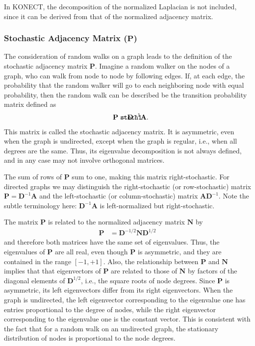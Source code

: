 \documentclass{article}
\def\mathnote#1{%
  \tag*{\rlap{\hspace\marginparsep\smash{\parbox[t]{\marginparwidth}{#1}}}}
}
\begin{document}
In KONECT, the decomposition of the normalized Laplacian is not
included, since it can be derived from that of the normalized adjacency
matrix. 

\subsubsection{Stochastic Adjacency Matrix ($\mathbf P$)}
The consideration of random walks on a graph leads to the definition of
the stochastic adjacency matrix $\mathbf P$.  Imagine a random walker on
the nodes of a graph, who can walk from node to node by following
edges.  If, at each edge, the probability that the random walker will go
to each neighboring node with equal probability, then the random walk
can be described be the transition probability matrix defined as
\begin{align}
  \mathnote{\texttt{stoch1}}
  \mathbf P &= \mathbf D^{-1} \mathbf A.
\end{align}
This matrix is called the stochastic adjacency matrix.  It is asymmetric,
even when the graph is undirected, except when the graph is regular,
i.e., when all degrees are the same.  
Thus, its eigenvalue decomposition
is not always defined, and in any case may not involve orthogonal
matrices. 

The sum of rows of $\mathbf P$ sum to one, making this matrix
right-stochastic. 
For directed graphs we may distinguish the right-stochastic (or
row-stochastic) matrix 
$\mathbf P = \mathbf D^{-1} \mathbf A$ and the left-stochastic (or column-stochastic)
matrix $\mathbf A \mathbf D^{-1}$.  Note the subtle terminology here:
$\mathbf D^{-1} \mathbf A$ is left-normalized but right-stochastic. 

The matrix $\mathbf P$ is related to the normalized adjacency matrix $\mathbf N$ by
\begin{align}
  \mathbf P &= \mathbf D^{-1/2} \mathbf N \mathbf D^{1/2}
\end{align}
and therefore both matrices have the same set of eigenvalues.
Thus, the eigenvalues of $\mathbf P$ are all real, even though
$\mathbf P$ is asymmetric, and they are contained in the range $[-1,+1]$. 
Also, the relationship between $\mathbf P$ and $\mathbf N$ implies that that
eigenvectors of $\mathbf P$ are related to those of 
$\mathbf N$ by factors of the diagonal elements of $\mathbf D^{1/2}$,
i.e., the square roots of node degrees. 
Since $\mathbf P$ is asymmetric, its left eigenvectors differ from its
right eigenvectors.  When the graph is undirected, the left eigenvector
corresponding to the eigenvalue one has entries proportional to the
degree of nodes, 
while the right eigenvector corresponding to the eigenvalue one 
is the constant vector.  This is consistent with the fact that for a
random walk on an undirected graph, the stationary distribution of nodes
is proportional to the node degrees. 
\end{document}
